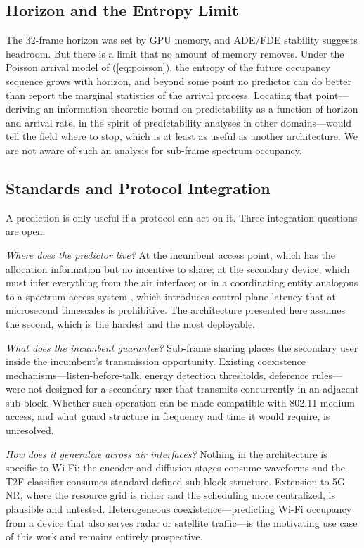 \documentclass[lettersize,journal]{IEEEtran}
\begin{document}
\subsection{Horizon and the Entropy Limit}
The 32-frame horizon was set by GPU memory, and ADE/FDE stability
suggests headroom. But there is a limit that no amount of memory
removes. Under the Poisson arrival model of (\ref{eq:poisson}), the
entropy of the future occupancy sequence grows with horizon, and beyond
some point no predictor can do better than report the marginal statistics
of the arrival process. Locating that point---deriving an
information-theoretic bound on predictability as a function of horizon
and arrival rate, in the spirit of predictability analyses in other
domains---would tell the field where to stop, which is at least as
useful as another architecture. We are not aware of such an analysis for
sub-frame spectrum occupancy.

\subsection{Standards and Protocol Integration}
A prediction is only useful if a protocol can act on it. Three
integration questions are open.

\emph{Where does the predictor live?} At the incumbent access point,
which has the allocation information but no incentive to share; at the
secondary device, which must infer everything from the air interface; or
in a coordinating entity analogous to a spectrum access system
\cite{FCC2015CBRS}, which introduces control-plane latency that at
microsecond timescales is prohibitive. The architecture presented here
assumes the second, which is the hardest and the most deployable.

\emph{What does the incumbent guarantee?} Sub-frame sharing places the
secondary user inside the incumbent's transmission opportunity. Existing
coexistence mechanisms---listen-before-talk, energy detection
thresholds, deference rules---were not designed for a secondary user
that transmits concurrently in an adjacent sub-block. Whether such
operation can be made compatible with 802.11 medium access, and what
guard structure in frequency and time it would require, is unresolved.

\emph{How does it generalize across air interfaces?} Nothing in the
architecture is specific to Wi-Fi; the encoder and diffusion stages
consume waveforms and the T2F classifier consumes standard-defined
sub-block structure. Extension to 5G NR, where the resource grid is
richer and the scheduling more centralized, is plausible and untested.
Heterogeneous coexistence---predicting Wi-Fi occupancy from a device
that also serves radar or satellite traffic---is the motivating use case
of this work and remains entirely prospective.
\end{document}
